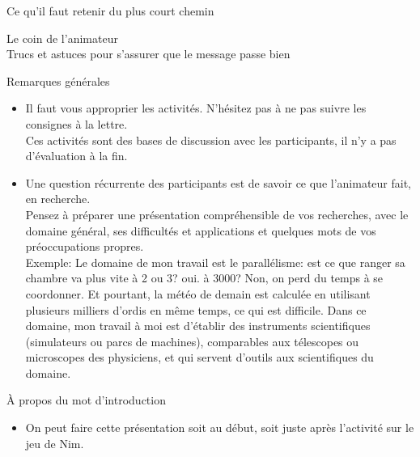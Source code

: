 \documentclass[final,hyperref={pdfpagelabels=false}]{beamer}
\renewcommand*{\footnotesize}{\fontsize{\resultfootnotesizeX}{\resultfootnotesizeY}\selectfont}
\renewcommand*{\large}{\fontsize{\resultlargeX}{\resultlargeY}\selectfont}
\begin{document}
\begin{frame}{Ce qu'il faut retenir du plus court chemin}

\end{frame}
\begin{frame}{Le coin de l'animateur\\[-5pt]
  {\large Trucs et astuces pour s'assurer que le message passe bien}}
  \begin{block}{Remarques générales}
    \begin{itemize}
    \item Il faut vous approprier les activités. N'hésitez pas à ne pas suivre
      les consignes à la lettre.\\
      Ces activités sont des bases de discussion avec les participants, il n'y
      a pas d'évaluation à la fin.
    \item Une question récurrente des participants est de savoir ce que
      l'animateur fait, en recherche.\\
      Pensez à préparer une présentation compréhensible de vos recherches, avec
      le domaine général, ses difficultés et applications et quelques mots de
      vos préoccupations propres.\\
      {\footnotesize Exemple: Le domaine de mon travail est le parallélisme:
        est ce que ranger sa chambre va plus vite à 2 ou 3? oui. à 3000? Non,
        on perd du temps à se coordonner. Et pourtant, la météo de demain est
        calculée en utilisant plusieurs milliers d'ordis en même temps, ce qui
        est difficile. Dans ce domaine, mon travail à moi est d'établir des
        instruments scientifiques (simulateurs ou parcs de machines),
        comparables aux télescopes ou microscopes des physiciens, et qui
        servent d'outils aux scientifiques du domaine.}
    \end{itemize}
  \end{block}
  \begin{block}{À propos du mot d'introduction}
    \begin{itemize}
    \item On peut faire cette présentation soit au début, soit juste après
      l'activité sur le jeu de Nim.

\end{itemize}
\end{block}
\end{frame}
\end{document}
